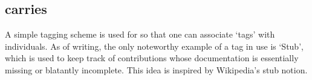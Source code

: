 
\subsection{carries}
\label{S:carries}

A simple tagging scheme is used for \solasote{} so that one can
associate `tags' with individuals. As of writing, the only noteworthy
example of a tag in use is `Stub', which is used to keep track of
contributions whose documentation is essentially missing or blatantly
incomplete. This idea is inspired by Wikipedia's stub notion.

